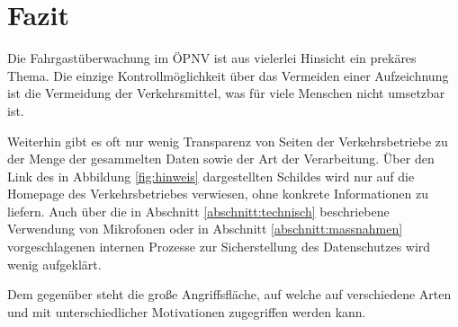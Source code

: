 \section{Fazit}
Die Fahrgastüberwachung im ÖPNV ist aus vielerlei Hinsicht ein prekäres Thema. Die einzige Kontrollmöglichkeit über das Vermeiden einer Aufzeichnung ist die Vermeidung der Verkehrsmittel, was für viele Menschen
nicht umsetzbar ist.

Weiterhin gibt es oft nur wenig Transparenz von Seiten der Verkehrsbetriebe zu der Menge der gesammelten Daten sowie der Art der Verarbeitung. Über den Link des in Abbildung \ref{fig:hinweis}
dargestellten Schildes wird nur auf die Homepage des Verkehrsbetriebes verwiesen, ohne konkrete Informationen zu liefern. Auch über die in Abschnitt \ref{abschnitt:technisch} beschriebene
Verwendung von Mikrofonen oder in Abschnitt \ref{abschnitt:massnahmen} vorgeschlagenen internen Prozesse zur Sicherstellung des Datenschutzes wird wenig aufgeklärt.

Dem gegenüber steht die große Angriffsfläche, auf welche auf verschiedene Arten und mit unterschiedlicher Motivationen zugegriffen werden kann.